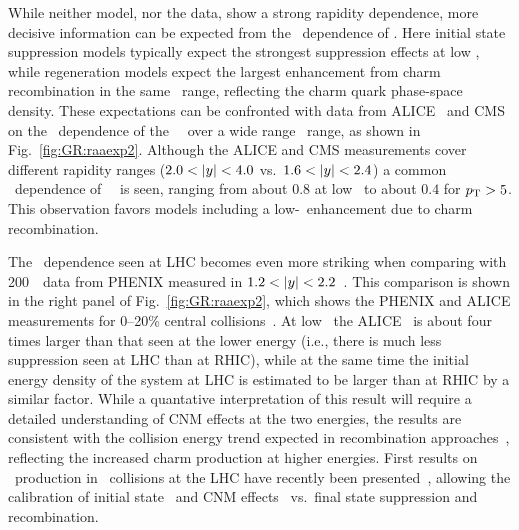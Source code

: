 While neither model, nor the data, show a strong rapidity dependence, more decisive
information can be expected from the \pT\ dependence of \Raa. Here initial state
suppression models typically expect the strongest suppression effects at low \pT, while
regeneration models expect the largest enhancement from charm recombination in the same \pT\ range,
reflecting the charm quark phase-space density.
These expectations can be confronted with data from ALICE~\cite{Abelev:2013ila} and CMS~\cite{Chatrchyan:2012np} on the \pT\ dependence of the
\jpsi\ \Raa\ over a wide range \pT\  range, as shown in Fig.~\ref{fig:GR:raaexp2}.
Although the ALICE and CMS measurements cover different rapidity ranges ($2.0 < |y| < 4.0$ vs.\ $ 1.6  < |y| < 2.4 $)
a common \pT\ dependence of \jpsi\ \Raa\ is seen, ranging from about $0.8$
at low \pT\ to about $0.4$ for $\mbox{$p_{\mathrm{T}}$} > 5$\GeVc.
This observation favors models including a low-\pT\ enhancement due to charm recombination.

The \pT\ dependence seen at LHC becomes even more striking when comparing with  200\GeV\ \AuAu\
data from PHENIX measured in $1.2 < |y| < 2.2$~\cite{Adare:2011yf}. This comparison is shown
in the right panel of Fig.~\ref{fig:GR:raaexp2}, which shows the PHENIX and
ALICE measurements for 0--20\% central collisions~\cite{Abelev:2013ila}.
At low \pT\ the ALICE \Raa\ is about four times larger than that seen at the lower energy (i.e.,
there is much less suppression seen at LHC than at RHIC), while
at the same time the initial energy density of the system at LHC is estimated to be larger than at
RHIC by a similar factor. While a quantative interpretation of this result will require
a detailed understanding of CNM effects at the two energies, the results are  consistent
with the collision energy trend expected in recombination
approaches~\cite{Zhao:2007hh,Zhou:2013aea,Liu:2009nb,Zhao:2010nk}, reflecting the
increased charm production at higher energies.
First results on \jpsi\ production in \pPb\ collisions at the LHC have recently
been presented~\cite{Abelev:2013yxa,Aaij:2013zxa}, allowing
the calibration of initial state~\cite{Albacete:2014fwa} and CNM effects~\cite{Brandt:2014vva}
vs.\ final state suppression and recombination.

